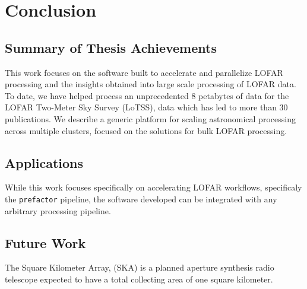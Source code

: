 \chapter{Conclusion}

\label{ch:conclusions}


\section{Summary of Thesis Achievements}

This work focuses on the software built to accelerate and parallelize LOFAR processing and the insights obtained into large scale processing of LOFAR data. To date, we have helped process an unprecedented 8 petabytes of data for the LOFAR Two-Meter Sky Survey (LoTSS), data which has led to  more than 30 publications. We describe a generic platform for scaling astronomical processing across multiple clusters, focused on the solutions for bulk LOFAR processing.  


\section{Applications}

While this work focuses specifically on accelerating LOFAR workflows, specificaly the \texttt{prefactor} pipeline, the software developed can be integrated with any arbitrary processing pipeline.  


\section{Future Work}

The Square Kilometer Array, (SKA) is a planned aperture synthesis radio telescope expected to have a total collecting area of one square kilometer.  
